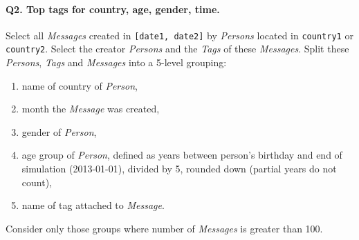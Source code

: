 \paragraph{\textbf{Q2}. Top tags for country, age, gender, time.}
Select all \emph{Messages} created in \texttt{{[}date1,\ date2{]}} by
\emph{Persons} located in \texttt{country1} or \texttt{country2}. Select
the creator \emph{Persons} and the \emph{Tags} of these \emph{Messages}.
Split these \emph{Persons}, \emph{Tags} and \emph{Messages} into a
5-level grouping:
\begin{enumerate}
\def\labelenumi{\arabic{enumi}.}
\tightlist
\item
  name of country of \emph{Person},
\item
  month the \emph{Message} was created,
\item
  gender of \emph{Person},
\item
  age group of \emph{Person}, defined as years between person's birthday
  and end of simulation (2013-01-01), divided by 5, rounded down
  (partial years do not count),
\item
  name of tag attached to \emph{Message}.
\end{enumerate}
Consider only those groups where number of \emph{Messages} is greater
than 100.
